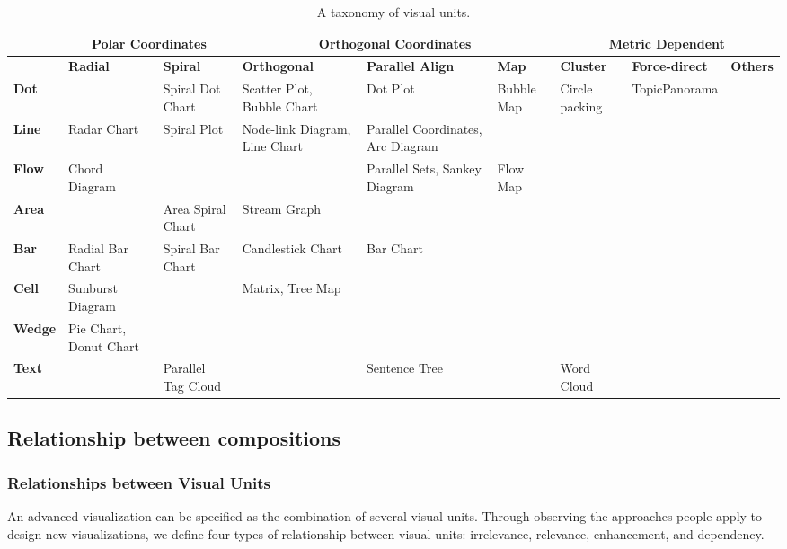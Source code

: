 \begin{table*}[tb]
  \caption{A taxonomy of visual units.}
  \label{tab:unit}
  \small
  \centering
  \begin{tabular}{|p{1.2cm}|p{1.2cm}|p{1.2cm}|p{1.2cm}|p{1.2cm}|p{1.2cm}|p{1.2cm}|p{1.2cm}|p{1.2cm}|}
  \toprule
   \textbf{} &\multicolumn{2}{|c|}{Polar Coordinates} &\multicolumn{3}{|c|}{Orthogonal Coordinates}&\multicolumn{3}{|c|}{Metric Dependent}   \\ 
  \midrule
  
 \textbf{} &\textbf{Radial} &\textbf{Spiral} &\textbf{Orthogonal} & \textbf{Parallel Align}&\textbf{Map}&\textbf{Cluster}&\textbf{Force-direct}&\textbf{Others}   \\ 
  \midrule
  \textbf{Dot} &    &Spiral Dot Chart&Scatter Plot, Bubble Chart & Dot Plot & Bubble Map &  Circle packing    &TopicPanorama\cite{7042494}  &    \\
  \midrule
  \textbf{Line}&  Radar Chart   &  Spiral Plot    &Node-link Diagram, Line Chart & Parallel Coordinates, Arc Diagram &    &   &     & \\ 
  \midrule
   \textbf{Flow}&  Chord Diagram   &    & &Parallel Sets, Sankey Diagram & 
   Flow Map  &   &   &\\
  \midrule
  \textbf{Area}&    &Area Spiral Chart &Stream Graph &  & & &   &\\ 
  \midrule
  \textbf{Bar}&      Radial Bar Chart & Spiral Bar Chart  & Candlestick Chart & Bar Chart  &    &    &    &\\
  \midrule
  \textbf{Cell}& Sunburst Diagram  &    & Matrix, Tree Map &     & & &   &\\
  \midrule
  \textbf{Wedge}& Pie Chart, Donut Chart &  &   &   &  &    &   &\\
  \midrule
  \textbf{Text}&    &Parallel Tag Cloud \cite{collins2009parallel} &    &  Sentence Tree  &     &Word Cloud  &   &    \\
  \bottomrule
  
  \end{tabular}
  \vspace{1mm}
\end{table*}


\subsection{Relationship between compositions}
\subsubsection{Relationships between Visual Units}
An advanced visualization can be specified as the combination of several visual units. Through observing the approaches people apply to design new visualizations, we define four types of relationship between visual units: irrelevance, relevance, enhancement, and dependency. 

